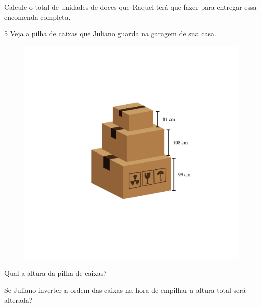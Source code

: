 Calcule o total de unidades de doces que Raquel terá que fazer para entregar essa encomenda completa.



\num{5} Veja a pilha de caixas que Juliano guarda na garagem de sua casa.

\begin{figure}[htpb!]
\includegraphics[width=\textwidth]{../ilustracoes/MAT5/SAEB_5ANO_MAT_figura19.png}
\end{figure}

\begin{escolha}
\item
  Qual a altura da pilha de caixas?



\item
  Se Juliano inverter a ordem das caixas na hora de empilhar a altura
  total será alterada?

\end{escolha}



